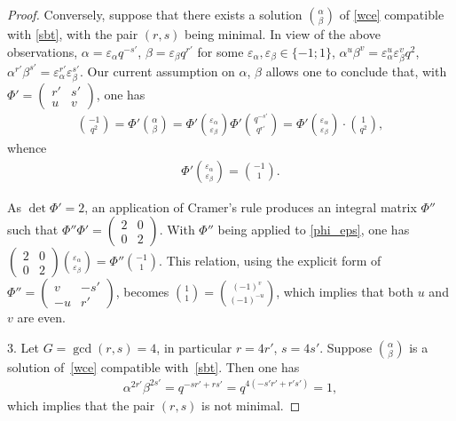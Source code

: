 \documentclass[pdftex]{sigma}
\numberwithin{equation}{section}
\begin{document}
\begin{proof}
Conversely, suppose that there exists a solution $\binom{\alpha}{\beta}$ of \eqref{wce} compatible with \eqref{sbt}, with the pair $(r,s)$ being minimal. In view of the above observations, $\alpha=\varepsilon_\alpha q^{-s'}$, $\beta=\varepsilon_\beta q^{r'}$ for some $\varepsilon_\alpha,\varepsilon_\beta\in\{-1;1\}$, $\alpha^u\beta^v=\varepsilon_\alpha^u\varepsilon_\beta^v q^2$, $\alpha^{r'}\beta^{s'}=\varepsilon_\alpha^{r'}\varepsilon_\beta^{s'}$. Our current assumption on $\alpha$, $\beta$ allows one to conclude that, with $\Phi'=\left(\begin{smallmatrix}r' & s'\\ u & v\end{smallmatrix}\right)$, one has
\begin{gather*}
\binom{-1}{q^2}=\Phi'\binom{\alpha}{\beta}=
\Phi'\binom{\varepsilon_\alpha}{\varepsilon_\beta}\Phi'\binom{q^{-s'}}{q^{r'}}
=\Phi'\binom{\varepsilon_\alpha}{\varepsilon_\beta}\cdot\binom{1}{q^2},
\end{gather*}
whence
\begin{gather}\label{phi_eps}
\Phi'\binom{\varepsilon_\alpha}{\varepsilon_\beta}=\binom{-1}1. \end{gather}

As $\det\Phi'=2$, an application of Cramer's rule produces an integral matrix $\Phi''$ such that $\Phi''\Phi'=\left(\begin{smallmatrix}2 & 0\\ 0 & 2\end{smallmatrix}\right)$. With $\Phi''$ being applied to \eqref{phi_eps}, one has $\left(\begin{smallmatrix}2 & 0\\ 0 & 2\end{smallmatrix}\right) \binom{\varepsilon_\alpha}{\varepsilon_\beta}=\Phi''\binom{-1}1$. This relation, using the explicit form of $\Phi''=\left(\begin{smallmatrix}v & -s'\\ -u & r'\end{smallmatrix}\right)$, becomes $\binom11=\binom{(-1)^v}{(-1)^{-u}}$, which implies that both $u$ and $v$ are even.

3. Let $G=\operatorname{gcd}(r,s)=4$, in particular $r=4r'$, $s=4s'$. Suppose $\binom{\alpha}{\beta}$ is a solution of~\eqref{wce} compatible with~\eqref{sbt}. Then one has
\begin{gather*}\alpha^{2r'}\beta^{2s'}=q^{-sr'+rs'}=q^{4(-s'r'+r's')}=1,\end{gather*}
which implies that the pair $(r,s)$ is not minimal.
\end{proof}
\end{document}
